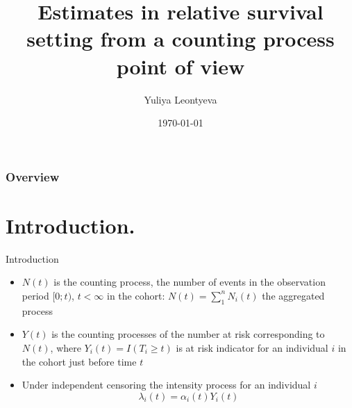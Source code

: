 \documentclass{beamer}
\title{Estimates in relative survival setting from a counting process point of view}
\author{Yuliya Leontyeva}
\institute{Karolinska Institute, MEB}
\date{{\today}}
\begin{document}
\maketitle

\begin{frame}
\frametitle{Overview} %
\tableofcontents %
\end{frame}


\section{Introduction.}

\begin{frame}{Introduction}
\small
\begin{itemize}
    \item $N(t)$ is the counting process, the number of events in the observation period $[0; t)$, $t < \infty$ in the cohort:
    $N(t) = \sum_1^n N_i(t)$ the aggregated process
    \item $Y(t)$ is the counting processes of the number at risk corresponding to $N(t)$, where $Y_{i}(t) = I(T_i \geq t)$ is at risk indicator for an individual $i$ in the cohort just before time $t$ 
    \item Under independent censoring the intensity process for an individual $i$  $$\lambda_i(t) = \alpha_i(t) Y_{i}(t)$$
 \end{itemize}
\end{frame}
 
\end{document}
